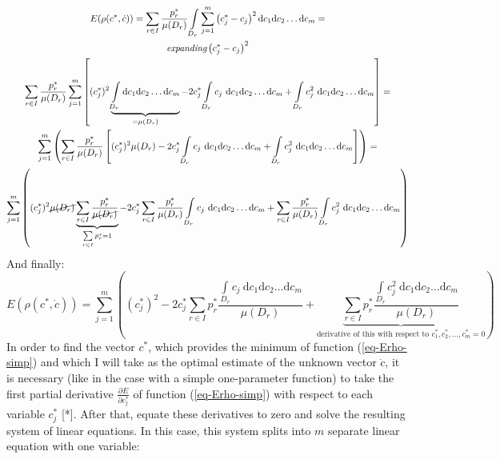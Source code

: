 \documentclass[11pt,a4paper]{article}
\numberwithin{equation}{subsection}
\begin{document}
\begin{gather}
\nonumber
E(\rho(c^{*},\dot{c}))=\sum\limits_{r \in I} \frac{p_{r}^{*}}{\mu(D_{r})} \int\limits_{D_{r}}\sum\limits_{j=1}^{m} \left( c_{j}^{*}-c_{j} \right)^{2}\mathrm{d}c_{1}\mathrm{d}c_{2}\dots \mathrm{d}c_{m} = \\
\nonumber
\textit{expanding} \left( c_{j}^{*}-c_{j} \right)^{2} \\
\nonumber
\sum\limits_{r \in I} \frac{p_{r}^{*}}{\mu(D_{r})} \sum\limits_{j=1}^{m} \left[ (c_{j}^{*})^{2} \underbrace{\int\limits_{D_{r}} \mathrm{d}c_{1}\mathrm{d}c_{2}\dots \mathrm{d}c_{m}}_{{=\mu(D_{r})}} - 2c_{j}^{*} \int\limits_{D_{r}} c_{j} \  \mathrm{d}c_{1}\mathrm{d}c_{2}\dots \mathrm{d}c_{m} + \int\limits_{D_{r}} c_{j}^{2} \  \mathrm{d}c_{1}\mathrm{d}c_{2}\dots \mathrm{d}c_{m}\right]= \\
\nonumber
\sum\limits_{j=1}^{m} \left( \sum\limits_{r \in I} \frac{p_{r}^{*}}{\mu(D_{r})} \left[ (c_{j}^{*})^{2} \mu(D_{r})-2c_{j}^{*} \int\limits_{D_{r}} c_{j} \  \mathrm{d}c_{1}\mathrm{d}c_{2}\dots \mathrm{d}c_{m} + \int\limits_{D_{r}} c_{j}^{2} \  \mathrm{d}c_{1}\mathrm{d}c_{2}\dots \mathrm{d}c_{m} \right] \right) = \\ 
\sum\limits_{j=1}^{m} \left( (c_{j}^{*})^{2} \cancel{\mu(D_{r})} \underbrace{\sum\limits_{r \in I} \frac{p_{r}^{*}}{\cancel{\mu(D_{r})}}}_{\sum\limits_{r \in I}p_{r}^{*} = 1} - 2c_{j}^{*} \sum\limits_{r \in I}\frac{p_{r}^{*}}{\mu(D_{r})} \int\limits_{D_{r}} c_{j} \  \mathrm{d}c_{1}\mathrm{d}c_{2}\dots \mathrm{d}c_{m} + \sum\limits_{r \in I}\frac{p_{r}^{*}}{\mu(D_{r})} \int\limits_{D_{r}} c_{j}^{2} \  \mathrm{d}c_{1}\mathrm{d}c_{2}\dots \mathrm{d}c_{m} \right)
\end{gather}
And finally:
\begin{equation}
E(\rho(c^{*},\dot{c}))= \sum\limits_{j=1}^{m} \left( (c_{j}^{*})^{2} - 2c_{j}^{*} \sum\limits_{r \in I} p_{r}^{*} \frac{\int\limits_{D_{r}} c_{j} \  \mathrm{d}c_{1}\mathrm{d}c_{2}\dots \mathrm{d}c_{m}}{\mu(D_{r})} + \underbrace{\sum\limits_{r \in I} p_{r}^{*} \frac{\int\limits_{D_{r}} c_{j}^{2} \  \mathrm{d}c_{1}\mathrm{d}c_{2}\dots \mathrm{d}c_{m}}{\mu(D_{r})}}_{\text{derivative of this with respect to } c_{1}^{*}, c_{2}^{*},\dots,c_{m}^{*} = 0} \right) \label{eq-Erho-simp}
\end{equation}
In order to find the vector $c^{*}$, which provides the minimum of function (\ref{eq-Erho-simp}) and which I will take as the optimal estimate of the unknown vector $\dot{c}$, it is necessary (like in the case with a simple one-parameter function) to take the first partial derivative $\frac{\partial E}{\partial c_{j}^{*}}$ of function (\ref{eq-Erho-simp}) with respect to each variable $c_{j}^{*}$ [*]. After that, equate these derivatives to zero and solve the resulting system of linear equations. In this case, this system splits into $m$ separate linear equation with one variable:
\end{document}
